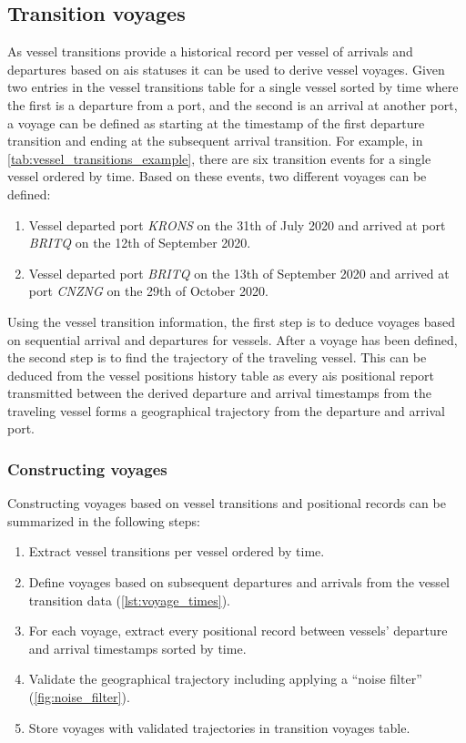
\subsection{Transition voyages}

As vessel transitions provide a historical record per vessel of arrivals and departures based on \acrshort{ais} statuses it can be used to derive vessel voyages. Given two entries in the vessel transitions table for a single vessel sorted by time where the first is a departure from a port, and the second is an arrival at another port, a voyage can be defined as starting at the timestamp of the first departure transition and ending at the subsequent arrival transition. For example, in \cref{tab:vessel_transitions_example}, there are six transition events for a single vessel ordered by time. Based on these events, two different voyages can be defined:

\begin{enumerate}
    \item  Vessel departed port \textit{KRONS} on the 31th of July 2020 and arrived at port \textit{BRITQ} on the 12th of September 2020.
    \item  Vessel departed port \textit{BRITQ} on the 13th of September 2020 and arrived at port \textit{CNZNG} on the 29th of October 2020.
\end{enumerate}

Using the vessel transition information, the first step is to deduce voyages based on sequential arrival and departures for vessels. After a voyage has been defined, the second step is to find the trajectory of the traveling vessel. This can be deduced from the vessel positions history table as every \acrshort{ais} positional report transmitted between the derived departure and arrival timestamps from the traveling vessel forms a geographical trajectory from the departure and arrival port.

\subsubsection{Constructing voyages}

Constructing voyages based on vessel transitions and positional records can be summarized in the following steps:

\begin{enumerate}
    \item Extract vessel transitions per vessel ordered by time.
    \item Define voyages based on subsequent departures and arrivals from the vessel transition data (\cref{lst:voyage_times}).
    \item For each voyage, extract every positional record between vessels' departure and arrival timestamps sorted by time.
    \item Validate the geographical trajectory including applying a ``noise filter'' (\cref{fig:noise_filter}).
    \item Store voyages with validated trajectories in transition voyages table.
\end{enumerate}


